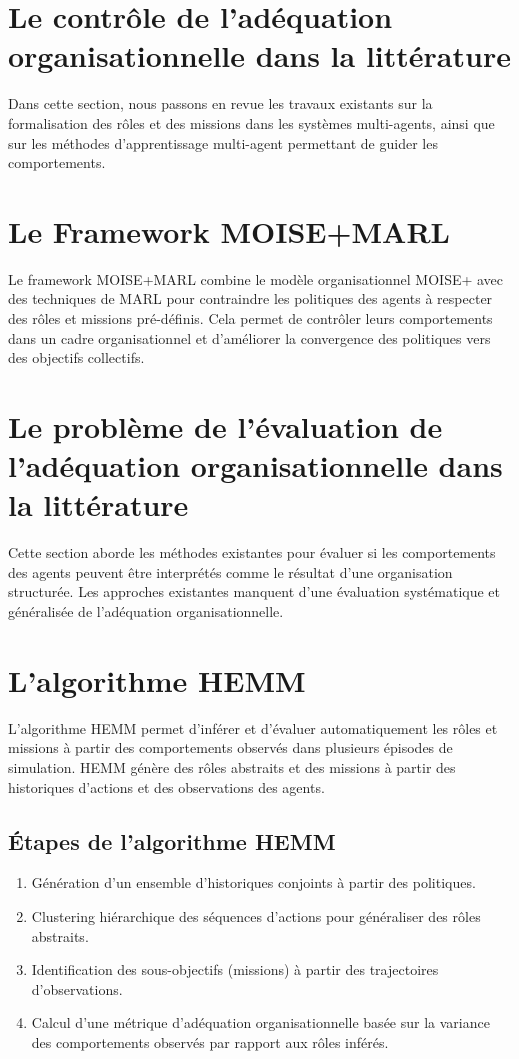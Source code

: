 \documentclass[sigconf,anonymous]{aamas}
\begin{document}
\section{Le contrôle de l'adéquation organisationnelle dans la littérature}

Dans cette section, nous passons en revue les travaux existants sur la formalisation des rôles et des missions dans les systèmes multi-agents, ainsi que sur les méthodes d'apprentissage multi-agent permettant de guider les comportements.

\section{Le Framework MOISE+MARL}
Le framework MOISE+MARL combine le modèle organisationnel MOISE+ avec des techniques de MARL pour contraindre les politiques des agents à respecter des rôles et missions pré-définis. Cela permet de contrôler leurs comportements dans un cadre organisationnel et d'améliorer la convergence des politiques vers des objectifs collectifs.

\section{Le problème de l'évaluation de l'adéquation organisationnelle dans la littérature}
Cette section aborde les méthodes existantes pour évaluer si les comportements des agents peuvent être interprétés comme le résultat d'une organisation structurée. Les approches existantes manquent d'une évaluation systématique et généralisée de l'adéquation organisationnelle.

\section{L'algorithme HEMM}
L'algorithme HEMM permet d'inférer et d'évaluer automatiquement les rôles et missions à partir des comportements observés dans plusieurs épisodes de simulation. HEMM génère des rôles abstraits et des missions à partir des historiques d'actions et des observations des agents.

\subsection{Étapes de l'algorithme HEMM}
\begin{enumerate}
    \item Génération d'un ensemble d'historiques conjoints à partir des politiques.
    \item Clustering hiérarchique des séquences d'actions pour généraliser des rôles abstraits.
    \item Identification des sous-objectifs (missions) à partir des trajectoires d'observations.
    \item Calcul d'une métrique d'adéquation organisationnelle basée sur la variance des comportements observés par rapport aux rôles inférés.
\end{enumerate}
\end{document}
